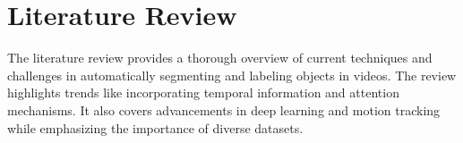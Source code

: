 \chapter{Literature Review}







 \noindent
The literature review provides a thorough overview of current techniques and challenges in automatically segmenting and labeling objects in videos. The review highlights trends like incorporating temporal information and attention mechanisms. It also covers advancements in deep learning and motion tracking while emphasizing the importance of diverse datasets.

\setcounter{equation}{0}
\setlength{\parskip}{3ex}

